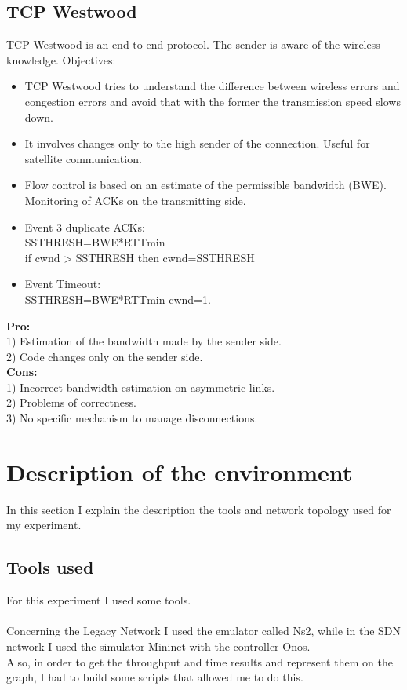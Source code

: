 {{\subsection{\normalsize TCP Westwood}{
TCP Westwood is an end-to-end protocol. The sender is aware of the wireless knowledge.
Objectives:
\begin{itemize}
\item TCP Westwood tries to understand the difference between wireless errors and congestion errors and avoid that with the former the transmission speed slows down.
\item It involves changes only to the high sender of the connection. Useful for satellite communication.
\item Flow control is based on an estimate of the permissible bandwidth (BWE). Monitoring of ACKs on the transmitting side.
\item Event 3 duplicate ACKs:\\
SSTHRESH=BWE*RTTmin\\
if cwnd > SSTHRESH then cwnd=SSTHRESH
\item Event Timeout:\\
SSTHRESH=BWE*RTTmin
cwnd=1.
\end{itemize}
\textbf{Pro:}\\
1) Estimation of the bandwidth made by the sender side.\\
2) Code changes only on the sender side.\\
\textbf{Cons:}\\
1) Incorrect bandwidth estimation on asymmetric links.\\
2) Problems of correctness.\\
3) No specific mechanism to manage disconnections.\\

}
}
\section{\normalsize Description of the environment}{	
In this section I explain the description the tools and network topology used for my experiment.
\subsection{Tools used}{
For this experiment I used some tools.\\\\Concerning the Legacy Network I used the emulator called Ns2, while in the SDN network I used the simulator Mininet with the controller Onos.\\Also, in order to get the throughput and time results and represent them on the graph, I had to build some scripts that allowed me to do this.\\
}}}
